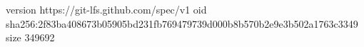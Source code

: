 version https://git-lfs.github.com/spec/v1
oid sha256:2f83ba408673b05905bd231fb769479739d000b8b570b2e9e3b502a1763c3349
size 349692
